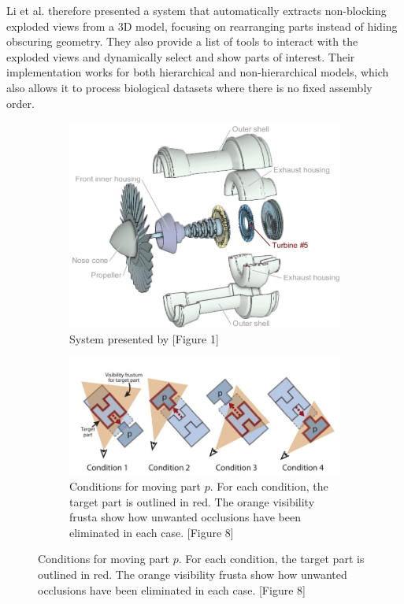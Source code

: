 Li et al. therefore presented a system that automatically extracts non-blocking exploded views from a 3D model, focusing on rearranging parts instead of hiding obscuring geometry.\cite{Wilmot_Li_2008}
They also provide a list of tools to interact with the exploded views and dynamically select and show parts of interest.
Their implementation works for both hierarchical and non-hierarchical models, which also allows it to process biological datasets where there is no fixed assembly order.  %
\begin{figure}
	\centering
	\normalsize
	\begin{subfigure}[t]{0.49\textwidth}
		\centering
		\includegraphics[width=.95\linewidth]{fig/Images/AutomatedGenerationofInteractive3DExplodedViewDiagrams_Li2008_fig1}
		\caption[]{System presented by \cite{Wilmot_Li_2008} [Figure 1]}
		
	\end{subfigure}
	\smallskip
	\begin{subfigure}[t]{0.5\textwidth}
		\centering
		\includegraphics[width=1.1\linewidth]{fig/Images/AutomatedGenerationofInteractive3DExplodedViewDiagrams_Li2008_fig8}
		\caption[]{Conditions for moving part $p$. For each condition, the target part is outlined in red. The orange visibility frusta show how unwanted occlusions have been eliminated in each case. \cite{Wilmot_Li_2008} [Figure 8]}
	\end{subfigure}
\end{figure}
